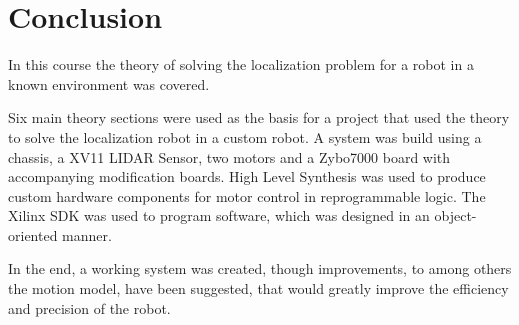 \documentclass[Main]{subfiles}
\begin{document}
\part{Conclusion} %
\label{cha:conclusion}

	In this course the theory of solving the localization problem for a robot in a known environment was covered.

	Six main theory sections were used as the basis for a project that used the theory to solve the localization robot in a custom robot.
	A system was build using a chassis, a XV11 LIDAR Sensor, two motors and a Zybo7000 board with accompanying modification boards.
	High Level Synthesis was used to produce custom hardware components for motor control in reprogrammable logic.
	The Xilinx SDK was used to program software, which was designed in an object-oriented manner.

	In the end, a working system was created, though improvements, to among others the motion model, have been suggested, that would greatly improve the efficiency and precision of the robot.
\end{document}
